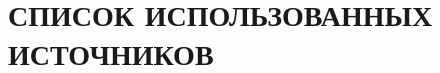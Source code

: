 \chapter*{СПИСОК ИСПОЛЬЗОВАННЫХ ИСТОЧНИКОВ}

\begin{enumerate}



    
    
    
            
    
    
    

\end{enumerate}
